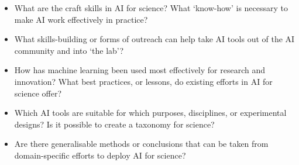 \begin{itemize}
\item
  What are the craft skills in AI for science? What `know-how' is
  necessary to make AI work effectively in practice?
\item
  What skills-building or forms of outreach can help take AI tools out
  of the AI community and into `the lab'?
\item
  How has machine learning been used most effectively for research and
  innovation? What best practices, or lessons, do existing efforts in AI
  for science offer?
\item
  Which AI tools are suitable for which purposes, disciplines, or
  experimental designs? Is it possible to create a taxonomy for science?
\item
  Are there generalisable methods or conclusions that can be taken from
  domain-specific efforts to deploy AI for science?
\end{itemize}
